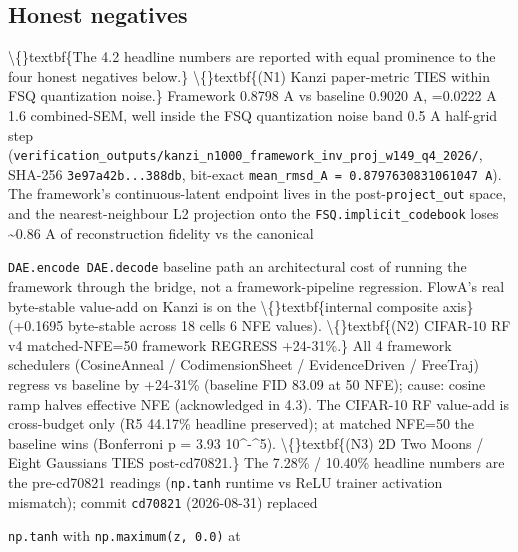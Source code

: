 \documentclass[preprint,3p,times,twocolumn]{elsarticle}
\begin{document}
\subsection{Honest negatives}
\textbackslash\{\}textbf\{The 4.2 headline numbers are reported with equal prominence to the four honest negatives below.\} \textbackslash\{\}textbf\{(N1) Kanzi paper-metric TIES within FSQ quantization noise.\} Framework 0.8798 A vs baseline 0.9020 A, =0.0222 A  1.6 combined-SEM, well inside the FSQ quantization noise band  0.5 A half-grid step (\texttt{verification\_outputs/kanzi\_n1000\_framework\_inv\_proj\_w149\_q4\_2026/}, SHA-256 \texttt{3e97a42b...388db}, bit-exact \texttt{mean\_rmsd\_A = 0.8797630831061047 A}). The framework's continuous-latent endpoint lives in the post-\texttt{project\_out} space, and the nearest-neighbour L2 projection onto the \texttt{FSQ.implicit\_codebook} loses \textasciitilde{}0.86 A of reconstruction fidelity vs the canonical

\texttt{DAE.encode  DAE.decode} baseline path  an architectural cost of running the framework through the bridge, not a framework-pipeline regression. FlowA's real byte-stable value-add on Kanzi is on the \textbackslash\{\}textbf\{internal composite axis\} (+0.1695 byte-stable across 18 cells  6 NFE values). \textbackslash\{\}textbf\{(N2) CIFAR-10 RF v4 matched-NFE=50 framework REGRESS +24-31\%.\} All 4 framework schedulers (CosineAnneal / CodimensionSheet / EvidenceDriven / FreeTraj) regress vs baseline by +24-31\% (baseline FID 83.09 at 50 NFE); cause: cosine ramp halves effective NFE (acknowledged in 4.3). The CIFAR-10 RF value-add is cross-budget only (R5 44.17\% headline preserved); at matched NFE=50 the baseline wins (Bonferroni p = 3.93  10\textasciicircum{}-\textasciicircum{}5). \textbackslash\{\}textbf\{(N3) 2D Two Moons / Eight Gaussians TIES post-cd70821.\} The 7.28\% / 10.40\% headline numbers are the pre-cd70821 readings (\texttt{np.tanh} runtime vs ReLU trainer activation mismatch); commit \texttt{cd70821} (2026-08-31) replaced

\texttt{np.tanh} with \texttt{np.maximum(z, 0.0)} at
\end{document}
